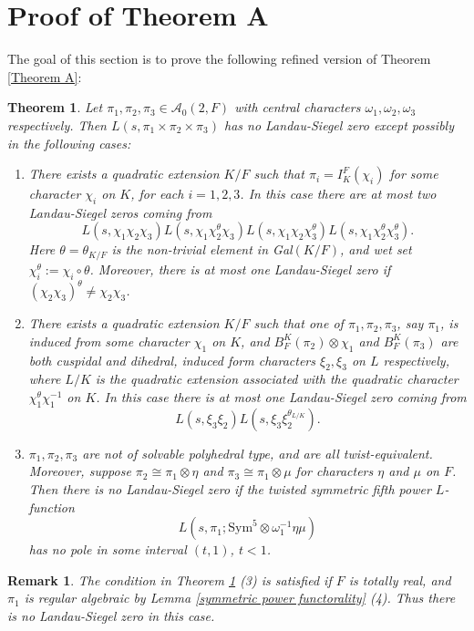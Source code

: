 \documentclass[12pt]{amsart}
\newcommand{\Sym}{\text{Sym}}
\newcommand{\cA}{\mathcal{A}}
\newtheorem{remark}{Remark}[section]
\newtheorem{theorem}{Theorem}[section]
\begin{document}
\section{Proof of Theorem A}\label{Section 3}

The goal of this section is to prove the following refined version of Theorem \ref{Theorem A}:

\begin{theorem}\label{Theorem A, refined version}
    Let $\pi_1,\pi_2,\pi_3 \in \cA_0(2,F)$ with central characters $\omega_1,\omega_2,\omega_3$ respectively. Then $L(s,\pi_1 \times \pi_2 \times \pi_3)$ has no Landau-Siegel zero except possibly in the following cases:
    \begin{enumerate}
            \item There exists a quadratic extension $K/F$ such that $\pi_i = I_K^F(\chi_i)$ for some character $\chi_i$ on $K$, for each $i=1,2,3$. In this case there are at most two Landau-Siegel zeros coming from    $$L(s,\chi_1\chi_2\chi_3)L(s,\chi_1\chi_2^\theta\chi_3)L(s,\chi_1\chi_2\chi_3^\theta)L(s,\chi_1\chi_2^\theta\chi_3^\theta).$$
            Here $\theta = \theta_{K/F}$ is the non-trivial element in Gal$(K/F)$, and wet set $\chi_i^\theta := \chi_i \circ \theta$. Moreover, there is at most one Landau-Siegel zero if $(\chi_2\chi_3)^{\theta} \neq \chi_2\chi_3$.
            \item There exists a quadratic extension $K/F$ such that one of $\pi_1,\pi_2,\pi_3$, say $\pi_1$, is induced from some character $\chi_1$ on $K$, and $B_F^K(\pi_2) \otimes \chi_1$ and $B_F^K(\pi_3)$ are both cuspidal and dihedral, induced form characters $\xi_2,\xi_3$ on $L$ respectively, where $L/K$ is the quadratic extension associated with the quadratic character $\chi_1^\theta\chi_1^{-1}$ on $K$. In this case there is at most one Landau-Siegel zero coming from 
            $$L(s,\xi_3\xi_2)L(s,\xi_3\xi_2^{\theta_{L/K}}).$$
            \item $\pi_1,\pi_2,\pi_3$ are not of solvable polyhedral type, and are all twist-equivalent. Moreover, suppose $\pi_2 \cong \pi_1 \otimes \eta$ and $\pi_3 \cong \pi_1 \otimes \mu$ for characters $\eta$ and $\mu$ on $F$. Then there is no Landau-Siegel zero if the twisted symmetric fifth power $L$-function
            $$L(s,\pi_1;\Sym^5 \otimes \omega_1^{-1}\eta\mu)$$
            has no pole in some interval $(t,1)$, $t<1$.
        \end{enumerate}
\end{theorem}

\begin{remark}
    The condition in Theorem \ref{Theorem A, refined version} (3) is satisfied if $F$ is totally real, and $\pi_1$ is regular algebraic by Lemma \ref{symmetric power functorality} (4). Thus there is no Landau-Siegel zero in this case.
\end{remark}
\end{document}
